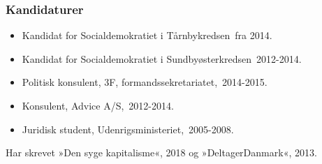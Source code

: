 \documentclass[11pt, a4paper]{awesome-cv}
\begin{document}
\begin{cvletter}
\subsubsection*{Kandidaturer}
\begin{itemize}
\item Kandidat for Socialdemokratiet i Tårnbykredsen fra 2014.
\item Kandidat for Socialdemokratiet i Sundbyøsterkredsen 2012-2014.
\end{itemize}
\begin{itemize}
\item Politisk konsulent, 3F, formandssekretariatet, 2014-2015.
\item Konsulent, Advice A/S, 2012-2014.
\item Juridisk student, Udenrigsministeriet, 2005-2008.
\end{itemize}
Har skrevet »Den syge kapitalisme«, 2018 og »DeltagerDanmark«, 2013.

\end{cvletter}
\end{document}
